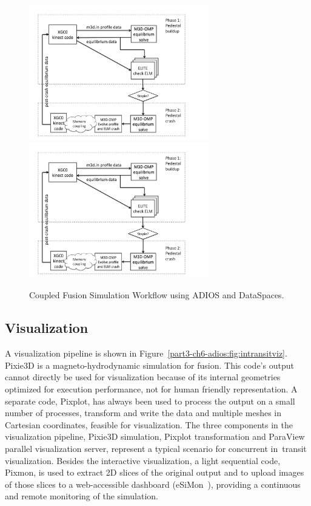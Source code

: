 \begin{figure}[h!]
\centering
\myIfColor
{
\includegraphics[width=0.7\textwidth]{Chapters/part3-ch6-adios/figs/coupling.png}
}
{
\includegraphics[width=0.7\textwidth]{Chapters/part3-ch6-adios/figs/coupling.png}
}
\caption[]
{Coupled Fusion Simulation Workflow using ADIOS and DataSpaces.
}
\label{part3-ch6-adios:fig:coupling}
\end{figure}


%
%
\subsection{Visualization}

A visualization pipeline is shown in Figure~\ref{part3-ch6-adios:fig:intransitviz}. Pixie3D \cite{ADIOS:Chacon:2002} is a  magneto-hydrodynamic simulation for fusion. This code's output cannot directly be used for visualization because of its internal geometries optimized for execution performance, not for human friendly representation. A separate code, Pixplot, has always been used to process the output on a small number of processes, transform and write the data and multiple meshes in Cartesian coordinates, feasible for visualization. The three components in the visualization pipeline, Pixie3D simulation, Pixplot transformation and ParaView parallel visualization server, represent a typical scenario for concurrent in~transit visualization. Besides the interactive visualization, a light sequential code, Pixmon, is used to extract 2D slices of the original output and to upload images of those slices to a web-accessible dashboard (eSiMon~\cite{ADIOS:Tchoua:cts12}), providing a continuous and remote monitoring of the simulation.


